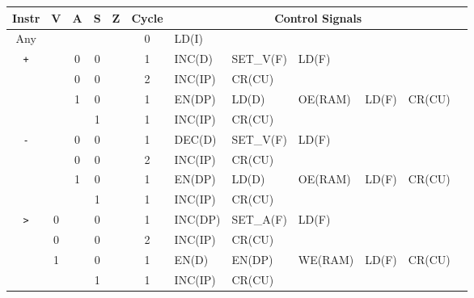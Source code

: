 

  \begin{longtable}[c] {c|cccc|c|llllll}
                     Instr        & V & A & S     & Z    & Cycle & \multicolumn{6}{c}{Control Signals}                      \\ \hline
    \rowcolor{White} Any          &   &   &       &      & 0     & LD(I)    &          &         &        &        &        \\ \hline
    \rowcolor{Gray}  \texttt{+}   &   & 0 & 0     &      & 1     & INC(D)   & SET\_V(F)& LD(F)   &        &        &        \\
    \rowcolor{Gray}               &   & 0 & 0     &      & 2     & INC(IP)  & CR(CU)   &         &        &        &        \\    
    \rowcolor{White}              &   & 1 & 0     &      & 1     & EN(DP)   & LD(D)    & OE(RAM) & LD(F)  & CR(CU) &        \\
    \rowcolor{Gray}               &   &   & 1     &      & 1     & INC(IP)  & CR(CU)   &         &        &        &        \\ \hline
    
    \rowcolor{White} \texttt{-}   &   & 0 & 0     &      & 1     & DEC(D)   & SET\_V(F)& LD(F)   &        &        &        \\
    \rowcolor{White}              &   & 0 & 0     &      & 2     & INC(IP)  & CR(CU)   &         &        &        &        \\
    \rowcolor{Gray}               &   & 1 & 0     &      & 1     & EN(DP)   & LD(D)    & OE(RAM) & LD(F)  & CR(CU) &        \\
    \rowcolor{White}              &   &   & 1     &      & 1     & INC(IP)  & CR(CU)   &         &        &        &        \\ \hline
    
    \rowcolor{Gray}  \texttt{>}   & 0 &   & 0     &      & 1     & INC(DP)  & SET\_A(F)& LD(F)   &        &        &        \\
    \rowcolor{Gray}               & 0 &   & 0     &      & 2     & INC(IP)  & CR(CU)   &         &        &        &        \\
    \rowcolor{White}              & 1 &   & 0     &      & 1     & EN(D)    & EN(DP)   & WE(RAM) & LD(F)  & CR(CU) &        \\
    \rowcolor{Gray}               &   &   & 1     &      & 1     & INC(IP)  & CR(CU)   &         &        &        &        \\ \hline
    

\end{longtable}
